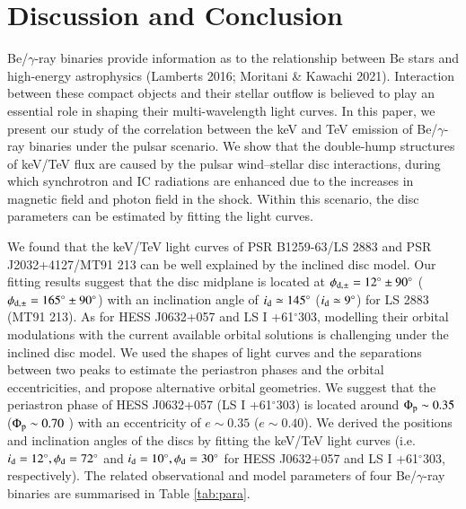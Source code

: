 \documentclass{aa}
\def\PSRB1259{PSR B1259-63/LS 2883}
\def\PSRJ2032{PSR J2032+4127/MT91 213}
\def\HESSJ0632{HESS J0632+057}
\def\LSI61{LS I +61$^{\circ}$303}
\begin{document}
\section{Discussion and Conclusion}

Be/$\gamma$-ray binaries provide information as to the relationship between Be stars and high-energy astrophysics (Lamberts 2016; Moritani \& Kawachi 2021). Interaction between these compact objects and their stellar outflow is believed to play an essential role in shaping their multi-wavelength light curves. In this paper, we present our study of the correlation between the keV and TeV emission of Be/$\gamma$-ray binaries under the pulsar scenario. We show that the double-hump structures of keV/TeV flux are caused by the pulsar wind--stellar disc interactions, during which synchrotron and IC radiations are enhanced due to the increases in magnetic field and photon field in the shock. Within this scenario, the disc parameters can be estimated by fitting the light curves.


We found that the keV/TeV light curves of \PSRB1259 and \PSRJ2032 can be well explained by the inclined disc model. Our fitting results suggest that the disc midplane is located at $\phi_{\rm d,\pm}=12^{\circ}\pm 90^{\circ}$ ($\phi_{\rm d,\pm}=165^{\circ}\pm 90^{\circ}$) with an inclination angle of $i_{\rm d}\simeq145^{\circ}$ ($i_{\rm d}\simeq 9^{\circ}$) for LS 2883 (MT91 213).
As for \HESSJ0632 and \LSI61, modelling their orbital modulations with the current available orbital solutions is challenging under the inclined disc model. We used the shapes of light curves and the separations between two peaks to estimate the periastron phases and the orbital eccentricities, and propose alternative orbital geometries.
We suggest that the periastron phase of \HESSJ0632 (\LSI61) is located around $\Phi_{\rm p}\sim 0.35$ ($\Phi_{\rm p}\sim 0.70$ ) with an eccentricity of $e\sim0.35$ ($e\sim0.40$).
We derived the positions and inclination angles of the discs by fitting the keV/TeV light curves (i.e. $i_{\rm d}=12^{\circ}, \phi_{\rm d}=72^{\circ}$ and $i_{\rm d}=10^{\circ}, \phi_{\rm d}=30^{\circ}$ for \HESSJ0632 and \LSI61, respectively). The related observational and model parameters of four Be/$\gamma$-ray binaries are summarised in Table \ref{tab:para}.
\end{document}

